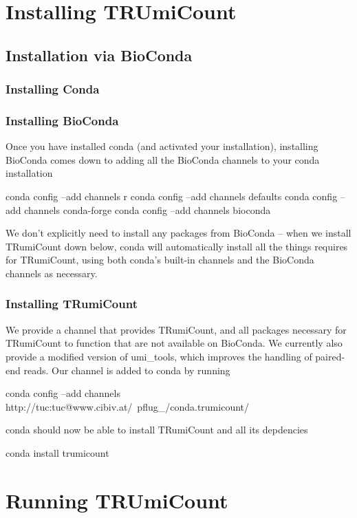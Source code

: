 \documentclass[10pt]{article}
\begin{document}
\section{Installing TRUmiCount}

\subsection{Installation via BioConda}

\subsubsection{Installing Conda}

\subsubsection{Installing BioConda}

Once you have installed conda (and activated your installation),
installing BioConda comes down to adding all the BioConda channels
to your conda installation

\begin{shellcode}
conda config --add channels r
conda config --add channels defaults
conda config --add channels conda-forge
conda config --add channels bioconda
\end{shellcode}

We don't explicitly need to install any packages from BioConda
-- when we install TRumiCount down below, conda will automatically
install all the things requires for TRumiCount, using both conda's
built-in channels and the BioConda channels as necessary.

\subsubsection{Installing TRumiCount}

We provide a channel that provides TRumiCount, and all packages
necessary for TRumiCount to function that are not available on
BioConda. We currently also provide a modified version of umi\_tools,
which improves the handling of paired-end reads. Our channel is added
to conda by running

\begin{shellcode}
conda config --add channels 
  http://tuc:tuc@www.cibiv.at/~pflug_/conda.trumicount/
\end{shellcode}

conda should now be able to install TRumiCount and all its depdencies

\begin{shellcode}
conda install trumicount
\end{shellcode}

\section{Running TRUmiCount}
\end{document}
